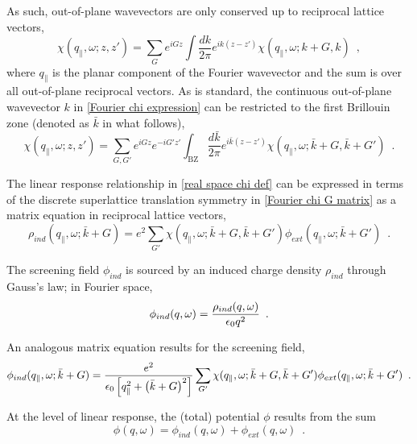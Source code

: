 As such, out-of-plane wavevectors are only conserved up to reciprocal lattice vectors,
\begin{equation}
    \label{Fourier chi expression}
    \chi(q_\parallel,\omega;z,z') = \sum_G e^{iG z} \int \frac{dk}{2\pi} e^{ik(z-z')}\chi(q_\parallel,\omega;k+G,k)
    \,\,\,,
\end{equation}
where $q_\parallel$ is the planar component of the Fourier wavevector and the sum is over all out-of-plane reciprocal vectors.  As is standard, the continuous out-of-plane wavevector $k$ in \eqref{Fourier chi expression} can be restricted to the first Brillouin zone (denoted as $\bar k$ in what follows),
\begin{equation}
    \label{Fourier chi G matrix}
    \chi(q_\parallel,\omega;z,z') = \sum_{G,G'} e^{iG z} e^{-i G' z'} \int_\text{BZ} \frac{d\bar k}{2\pi} e^{i\bar k(z-z')}\chi(q_\parallel,\omega;\bar k+G,\bar k+G')
    \,\,\,.
\end{equation}





The linear response relationship in \eqref{real space chi def} can be expressed in terms of the discrete superlattice translation symmetry in \eqref{Fourier chi G matrix} as a matrix equation in reciprocal lattice vectors,
\begin{equation}
    \label{planar linear response}
     \rho_{ind}(q_\parallel,\omega;\bar k+G) = e^2\sum_{G'}\chi(q_\parallel,\omega;\bar k+G, \bar k+G')
     \phi_{ext}(q_\parallel,\omega;\bar k+G')
     \,\,\,.
\end{equation}


The screening field $\phi_{ind}$ is sourced by an induced charge density $\rho_{ind}$ through Gauss's law; in Fourier space,
\begin{equation}
    \label{Fourier phi ind}
    \phi_{ind}(q,\omega) = \frac{\rho_{ind}(q,\omega)}{\epsilon_0 q^2}
    \,\,\,.
\end{equation}


An analogous matrix equation results for the screening field,
\begin{equation}
    \label{planar phi ind}
     \phi_{ind}(q_\parallel,\omega;\bar k+G) = \frac{e^2}{\epsilon_0\left[ q_\parallel^2+\left(\bar k+G\right)^2\right]} \sum_{G'}\chi(q_\parallel,\omega;\bar k+G, \bar k+G')
     \phi_{ext}(q_\parallel,\omega;\bar k+G')
     \,\,\,.
\end{equation}


At the level of linear response, the (total) potential $\phi$ results from the sum
\begin{equation}
    \label{phi def}
    \phi(q,\omega) = \phi_{ind}(q,\omega) + \phi_{ext}(q,\omega)
    \,\,\,.
\end{equation}


